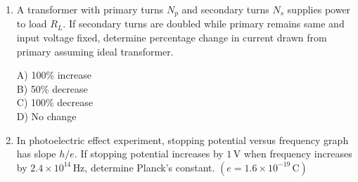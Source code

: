 \documentclass[12pt]{article}
\begin{document}
\begin{enumerate}
A) $2\omega,\; \dfrac{\pi}{\omega}$\\

B) $\omega,\; \dfrac{2\pi}{\omega}$\\

C) $2\omega,\; \dfrac{\pi}{2\omega}$\\

D) $\omega,\; \dfrac{\pi}{\omega}$


\item A transformer with primary turns $N_p$ and secondary turns $N_s$ supplies power to load $R_L$. If secondary turns are doubled while primary remains same and input voltage fixed, determine percentage change in current drawn from primary assuming ideal transformer.\\

\begin{center}
\end{center}

A) 100\% increase\\

B) 50\% decrease\\

C) 100\% decrease\\

D) No change


\item In photoelectric effect experiment, stopping potential versus frequency graph has slope $h/e$. If stopping potential increases by $1\,\text{V}$ when frequency increases by $2.4\times10^{14}\,\text{Hz}$, determine Planck’s constant. $(e=1.6\times10^{-19}\,\text{C})$\\

\begin{center}
\begin{tikzpicture}[scale=1]


\end{tikzpicture}
\end{center}
\end{enumerate}
\end{document}
